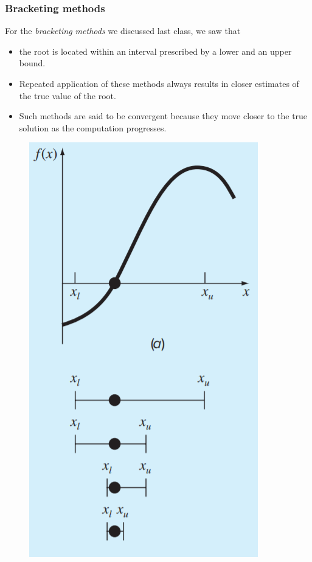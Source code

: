 \documentclass{if-beamer}
\begin{document}
\begin{frame}
\frametitle{Bracketing methods}
\begin{minipage}{0.5\textwidth}
	For the \textit{bracketing methods} we discussed last class, we saw that \\\vspace{7pt}
	\begin{itemize}
		\item the root is located within an interval prescribed by a lower and an upper bound.\\\vspace{7pt}
		\item  Repeated application of these methods always results in closer estimates of the true value of the root.\\\vspace{7pt}
		\item Such methods are said to be convergent because they move closer to the true solution as the computation progresses.
	\end{itemize} 
\end{minipage}
\begin{minipage}{0.5\textwidth}
	\begin{figure}
		\centering
		\includegraphics[width=.55\textwidth]{figures/bisection}
	\end{figure}
\end{minipage}
\end{frame}	
\end{document}
